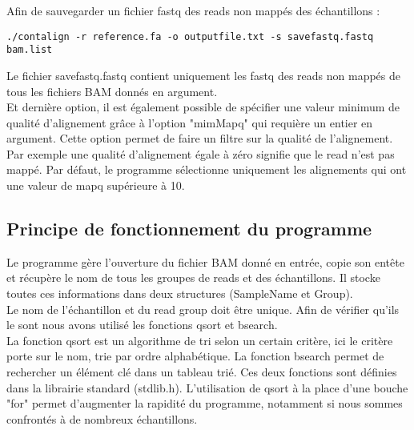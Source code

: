 \documentclass[a4paper,12pt]{article}
\begin{document}
Afin de sauvegarder un fichier fastq des reads non mappés des échantillons : 
\begin{lstlisting}
./contalign -r reference.fa -o outputfile.txt -s savefastq.fastq bam.list \end{lstlisting}
Le fichier savefastq.fastq contient uniquement les fastq des reads non mappés de tous les fichiers BAM donnés en argument. \\

Et dernière option, il est également possible de spécifier une valeur minimum de qualité d'alignement grâce à l'option "mimMapq" qui requière un entier en argument. Cette option permet de faire un filtre sur la qualité de l'alignement. Par exemple une qualité d'alignement égale à zéro signifie que le read n'est pas mappé. Par défaut, le programme sélectionne uniquement les alignements qui ont une valeur de mapq supérieure à 10. 


\subsection{Principe de fonctionnement du programme}


Le programme gère l'ouverture du fichier BAM donné en entrée, copie son entête et récupère le nom de tous les groupes de reads et des échantillons. Il stocke toutes ces informations dans deux structures (SampleName et Group). \\
Le nom de l'échantillon et du read group doit être unique. Afin de vérifier qu'ils le sont nous avons utilisé les fonctions qsort et bsearch.  \\La fonction qsort est un algorithme de tri selon un certain critère, ici le critère porte sur le nom, trie par ordre alphabétique. La fonction bsearch permet de rechercher un élément clé dans un tableau trié. Ces deux fonctions sont définies dans la librairie standard (stdlib.h). L'utilisation de qsort à la place d'une bouche "for" permet d'augmenter la rapidité du programme, notamment si nous sommes confrontés à de nombreux échantillons.\\
\end{document}
